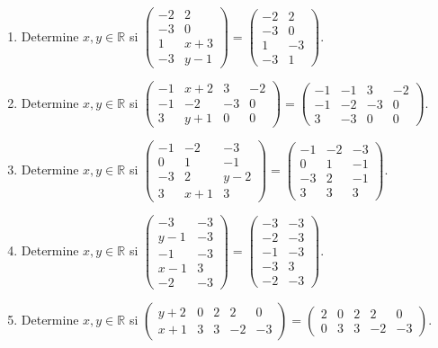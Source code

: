 \documentclass[12pt]{article}
\theoremstyle{remark}
\newcounter{contadorEjercicio}
\newenvironment{listaejercicios}{\begin{enumerate}[label=\textbf{E\arabic*.},leftmargin=2.4em,itemsep=0.52em]\setcounter{enumi}{\value{contadorEjercicio}}}{\setcounter{contadorEjercicio}{\value{enumi}}\end{enumerate}}
\begin{document}
\begin{listaejercicios}
\item Determine $x,y\in\mathbb R$ si $\begin{pmatrix}-2&2\\-3&0\\1&x + 3\\-3&y - 1\end{pmatrix}=\begin{pmatrix}-2&2\\-3&0\\1&-3\\-3&1\end{pmatrix}$.

\item Determine $x,y\in\mathbb R$ si $\begin{pmatrix}-1&x + 2&3&-2\\-1&-2&-3&0\\3&y + 1&0&0\end{pmatrix}=\begin{pmatrix}-1&-1&3&-2\\-1&-2&-3&0\\3&-3&0&0\end{pmatrix}$.

\item Determine $x,y\in\mathbb R$ si $\begin{pmatrix}-1&-2&-3\\0&1&-1\\-3&2&y - 2\\3&x + 1&3\end{pmatrix}=\begin{pmatrix}-1&-2&-3\\0&1&-1\\-3&2&-1\\3&3&3\end{pmatrix}$.

\item Determine $x,y\in\mathbb R$ si $\begin{pmatrix}-3&-3\\y - 1&-3\\-1&-3\\x - 1&3\\-2&-3\end{pmatrix}=\begin{pmatrix}-3&-3\\-2&-3\\-1&-3\\-3&3\\-2&-3\end{pmatrix}$.

\item Determine $x,y\in\mathbb R$ si $\begin{pmatrix}y + 2&0&2&2&0\\x + 1&3&3&-2&-3\end{pmatrix}=\begin{pmatrix}2&0&2&2&0\\0&3&3&-2&-3\end{pmatrix}$.


\end{listaejercicios}
\end{document}
